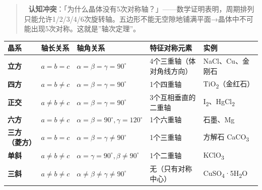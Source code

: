 \documentclass[a4paper,11pt]{ctexart}
\newcounter{none}
\begin{document}
\begin{quote}
🧠 \textbf{认知冲突}：「为什么晶体没有5次对称轴？」------数学证明表明，周期排列只能允许1/2/3/4/6次旋转轴。五边形不能无空隙地铺满平面→晶体中不可能出现5次对称。这就是''轴次定理''。
\end{quote}

{\def\LTcaptype{none} %
\begin{longtable}[]{@{}
  >{\raggedright\arraybackslash}p{}
  >{\raggedright\arraybackslash}p{}
  >{\raggedright\arraybackslash}p{}
  >{\raggedright\arraybackslash}p{}
  >{\raggedright\arraybackslash}p{}@{}}
\toprule\noalign{}
\begin{minipage}[b]{\linewidth}\raggedright
晶系
\end{minipage} & \begin{minipage}[b]{\linewidth}\raggedright
轴长关系
\end{minipage} & \begin{minipage}[b]{\linewidth}\raggedright
轴角关系
\end{minipage} & \begin{minipage}[b]{\linewidth}\raggedright
特征对称元素
\end{minipage} & \begin{minipage}[b]{\linewidth}\raggedright
实例
\end{minipage} \\
\midrule\noalign{}
\endhead
\bottomrule\noalign{}
\endlastfoot
\textbf{立方} & \(a = b = c\) & \(\alpha = \beta = \gamma = 90^\circ\) & 4个三重轴（体对角线方向） & NaCl、Cu、金刚石 \\
\textbf{四方} & \(a = b \neq c\) & \(\alpha = \beta = \gamma = 90^\circ\) & 1个四重轴 & TiO\textsubscript{2}（金红石） \\
\textbf{正交} & \(a \neq b \neq c\) & \(\alpha = \beta = \gamma = 90^\circ\) & 3个互相垂直的二重轴 & I\textsubscript{2}、HgCl\textsubscript{2} \\
\textbf{六方} & \(a = b \neq c\) & \(\alpha = \beta = 90^\circ, \gamma = 120^\circ\) & 1个六重轴 & 石墨、Mg \\
\textbf{三方（菱方）} & \(a = b = c\) & \(\alpha = \beta = \gamma \neq 90^\circ\) & 1个三重轴 & 方解石 CaCO\textsubscript{3} \\
\textbf{单斜} & \(a \neq b \neq c\) & \(\alpha = \gamma = 90^\circ, \beta \neq 90^\circ\) & 1个二重轴 & KClO\textsubscript{3} \\
\textbf{三斜} & \(a \neq b \neq c\) & \(\alpha \neq \beta \neq \gamma \neq 90^\circ\) & 无（只有对称中心） & CuSO\textsubscript{4}·5H\textsubscript{2}O \\
\end{longtable}
}
\end{document}
